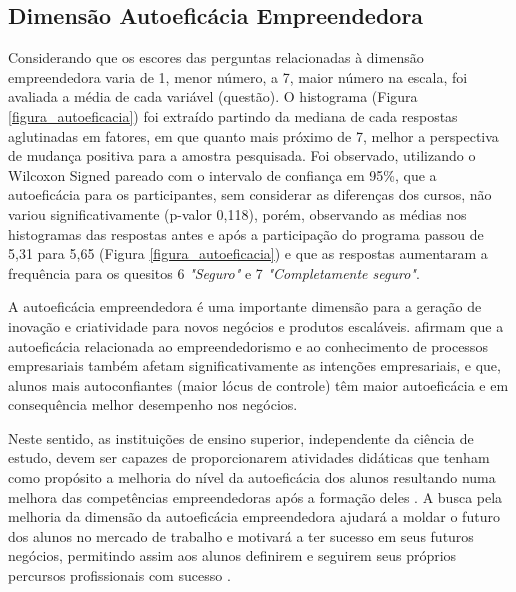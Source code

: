\subsection{Dimensão Autoeficácia Empreendedora}

Considerando que os escores das perguntas relacionadas à dimensão empreendedora varia de 1, menor número, a 7, maior número na escala, foi avaliada a média de cada variável (questão). O histograma (Figura \ref{figura_autoeficacia}) foi extraído partindo da mediana de cada respostas aglutinadas em fatores, em que quanto mais próximo de 7, melhor a perspectiva de mudança positiva para a amostra pesquisada. Foi observado, utilizando o Wilcoxon Signed pareado com o intervalo de confiança em 95\%, que a autoeficácia para os participantes, sem considerar as diferenças dos cursos, não variou significativamente (p-valor 0,118), porém, observando as médias nos histogramas das respostas antes e após a participação do programa passou de 5,31 para 5,65 (Figura \ref{figura_autoeficacia}) e que as respostas aumentaram a frequência para os quesitos 6 \textit{"Seguro"} e 7 \textit{"Completamente seguro"}.

A autoeficácia empreendedora é uma importante dimensão para a geração de inovação e criatividade para novos negócios e produtos escaláveis.  afirmam que a autoeficácia relacionada ao empreendedorismo e ao conhecimento de processos empresariais também afetam significativamente as intenções empresariais, e que, alunos mais autoconfiantes (maior lócus de controle) têm maior autoeficácia e em consequência melhor desempenho nos negócios.

Neste sentido, as instituições de ensino superior, independente da ciência de estudo, devem ser capazes de proporcionarem atividades didáticas que tenham como propósito a melhoria do nível da autoeficácia dos alunos resultando numa melhora das competências empreendedoras após a formação deles \cite{ribeiro_autoeficacia_2019}. A busca pela melhoria da dimensão da autoeficácia empreendedora ajudará a moldar o futuro dos alunos no mercado de trabalho e motivará a ter sucesso em seus futuros negócios, permitindo assim aos alunos definirem e seguirem seus próprios percursos profissionais com sucesso \cite{das_examining_2018}.

